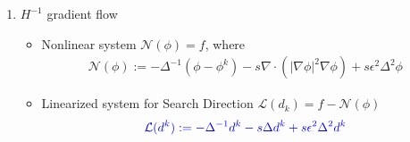 \documentclass[amstex]{beamer}
\begin{document}
\begin{CJK*}{GBK}{kai}
\begin{frame}
\begin{enumerate}
	\item $H^{-1}$ gradient flow {}
	    \begin{itemize}
	    	\item  Nonlinear system $\mathcal{N}(\phi)=f$, where
		{\small \begin{eqnarray*}
		\mathcal{N}(\phi) :=-\Delta^{-1}(\phi-\phi^k)- s\nabla \cdot \left( \left| \nabla \phi\right|^2 \nabla \phi \right) +s\epsilon^2 \Delta^2 \phi
				\end{eqnarray*}}
		\item Linearized system for Search Direction $\mathcal{L}(d_k) =f-\mathcal{N}(\phi)$ 
				{\small \begin{eqnarray*}
					{\color{blue}	\mathcal{L}(d^k) :=-\Delta^{-1} d^k- s\Delta d^k +s\epsilon^2 \Delta^2 d^k}
					\end{eqnarray*}}
	     \end{itemize}
	\end{enumerate}
		

\end{frame}


\end{CJK*}
\end{document}
